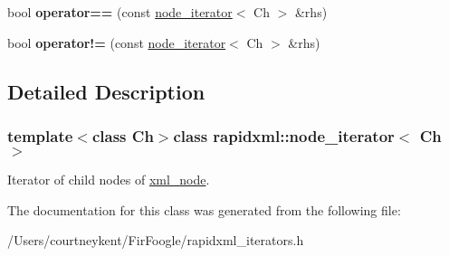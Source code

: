 \begin{DoxyCompactItemize}
\item 
\hypertarget{classrapidxml_1_1node__iterator_a5cb8a3b0d65a1a2517995e986a4debfd}{bool {\bfseries operator==} (const \hyperlink{classrapidxml_1_1node__iterator}{node\+\_\+iterator}$<$ Ch $>$ \&rhs)}\label{classrapidxml_1_1node__iterator_a5cb8a3b0d65a1a2517995e986a4debfd}

\item 
\hypertarget{classrapidxml_1_1node__iterator_a20f1e25347d7e3856694f18597f7c8e2}{bool {\bfseries operator!=} (const \hyperlink{classrapidxml_1_1node__iterator}{node\+\_\+iterator}$<$ Ch $>$ \&rhs)}\label{classrapidxml_1_1node__iterator_a20f1e25347d7e3856694f18597f7c8e2}

\end{DoxyCompactItemize}


\subsection{Detailed Description}
\subsubsection*{template$<$class Ch$>$class rapidxml\+::node\+\_\+iterator$<$ Ch $>$}

Iterator of child nodes of \hyperlink{singletonrapidxml_1_1xml__node}{xml\+\_\+node}. 

The documentation for this class was generated from the following file\+:\begin{DoxyCompactItemize}
\item 
/\+Users/courtneykent/\+Fir\+Foogle/rapidxml\+\_\+iterators.\+h\end{DoxyCompactItemize}
